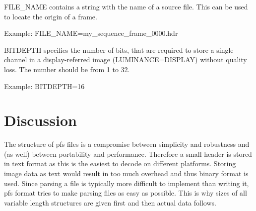 \documentclass[a4paper,12pt,english]{article}
\begin{document}
\begin{description}
 \item FILE\_NAME contains a string with the name of a source file.
   This can be used to locate the origin of a frame.

   Example: FILE\_NAME=my\_sequence\_frame\_0000.hdr

 \item BITDEPTH specifies the number of bits, that are required to
   store a single channel in a display-referred image
   (LUMINANCE=DISPLAY) without quality loss. The number should be from
   1 to 32. 

   Example: BITDEPTH=16

 \end{description}
 
\section{Discussion}

The structure of pfs files is a compromise between simplicity and
robustness and (as well) between portability and performance. Therefore
a small header is stored in text format as this is the easiest to
decode on different platforms. Storing image data as text would result
in too much overhead and thus binary format is used. Since parsing a file
is typically more difficult to implement than writing it, pfs format
tries to make parsing files as easy as possible. This is why sizes of
all variable length structures are given first and then actual data
follows.
\end{document}
